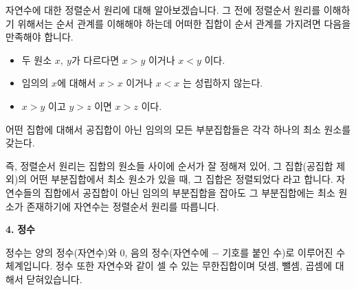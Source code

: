 \begin{flushleft}
    자연수에 대한 정렬순서 원리에 대해 알아보겠습니다. 그 전에 정렬순서 원리를 이해하기 위해서는 순서 관계를 이해해야 하는데 어떠한 집합이 순서 관계를 가지려면 다음을 만족해야 합니다.
\end{flushleft}

\begin{tcolorbox}[colback = white, colframe = Definition, title = \textmd{정의: 순서 관계}]
    \begin{itemize}
            \item 두 원소 $x, \ y$가 다르다면 $x > y$ 이거나 $x < y$ 이다.
            \item 임의의 $x$에 대해서 $x > x$ 이거나 $x < x$ 는 성립하지 않는다.
            \item $x >y$ 이고 $y > z$ 이면 $x > z$ 이다.
    \end{itemize}
\end{tcolorbox}

\begin{tcolorbox}[colback = white, colframe = Theorem, title = \textmd{정리: 정렬순서 원리}]
    어떤 집합에 대해서 공집합이 아닌 임의의 모든 부분집합들은 각각 하나의 최소 원소를 갖는다.
\end{tcolorbox}

\begin{flushleft}
    즉, 정렬순서 원리는 집합의 원소들 사이에 순서가 잘 정해져 있어, 그 집합(공집합 제외)의 어떤 부분집합에서 최소 원소가 있을 때, 그 집합은 정렬되었다 라고 합니다. 자연수들의 집합에서 공집합이 아닌 임의의 부분집합을 잡아도 그 부분집합에는 최소 원소가 존재하기에 자연수는 정렬순서 원리를 따릅니다.
\end{flushleft}

\newpage
\begin{flushleft}
    {\setmainfont[Path=FONT/]{KOPUBWORLD_DOTUM_PRO_BOLD.OTF}\textcolor{header}{{\huge\textbf{4.}}}}
    {\textcolor{header}{{\huge\textbf{정수}}}}
\end{flushleft}

\begin{flushleft}
    정수는 양의 정수(자연수)와 0, 음의 정수(자연수에 $-$ 기호를 붙인 수)로 이루어진 수 체계입니다. 정수 또한 자연수와 같이 셀 수 있는 무한집합이며 덧셈, 뺄셈, 곱셈에 대해서 닫혀있습니다.
\end{flushleft}

